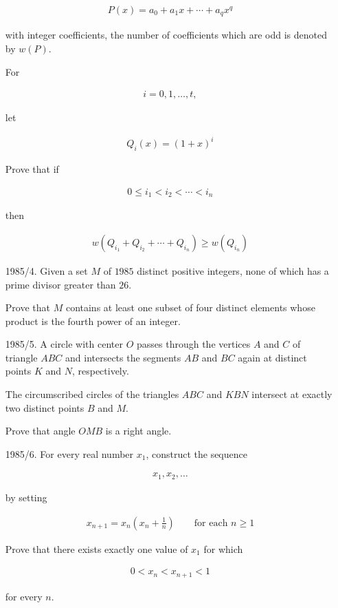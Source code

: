 \documentclass[12pt]{article}
\begin{document}
\begin{enumerate}
\begin{align*}
P(x)=a_0+a_1x+\cdots+a_qx^q
\end{align*}

with integer coefficients, the number of coefficients which are odd is denoted by $w(P)$.

For

\begin{align*}
i=0,1,\ldots,t,
\end{align*}

let

\begin{align*}
Q_i(x)=(1+x)^i
\end{align*}

Prove that if

\begin{align*}
0\leq i_1<i_2<\cdots<i_n
\end{align*}

then

\begin{align*}
w(Q_{i_1}+Q_{i_2}+\cdots+Q_{i_n})\geq w(Q_{i_n})
\end{align*}

\vspace{0.5cm}

\item[1985/4.]
Given a set $M$ of $1985$ distinct positive integers, none of which has a prime divisor greater than $26$.

Prove that $M$ contains at least one subset of four distinct elements whose product is the fourth power of an integer.

\vspace{0.5cm}

\item[1985/5.]
A circle with center $O$ passes through the vertices $A$ and $C$ of triangle $ABC$ and intersects the segments $AB$ and $BC$ again at distinct points $K$ and $N$, respectively.

The circumscribed circles of the triangles $ABC$ and $KBN$ intersect at exactly two distinct points $B$ and $M$.

Prove that angle $OMB$ is a right angle.

\vspace{0.5cm}

\item[1985/6.]
For every real number $x_1$, construct the sequence

\begin{align*}
x_1,x_2,\ldots
\end{align*}

by setting

\begin{align*}
x_{n+1}=x_n\left(x_n+\frac{1}{n}\right)
\qquad \text{for each } n\geq 1
\end{align*}

Prove that there exists exactly one value of $x_1$ for which

\begin{align*}
0<x_n<x_{n+1}<1
\end{align*}

for every $n$.

\end{enumerate}
\end{document}
